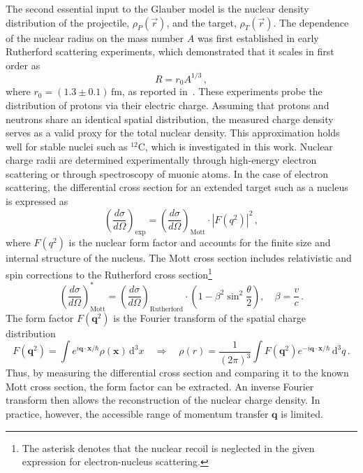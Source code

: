 \begin{description}
The second essential input to the Glauber model is the nuclear density distribution of the projectile, \( \rho_P(\vec{r}) \), and the target, \( \rho_T(\vec{r}) \). The dependence of the nuclear radius on the mass number \( A \) was first established in early Rutherford scattering experiments, which demonstrated that it scales in first order as
\begin{equation}
R = r_0 A^{1/3} \, ,
\end{equation}
where \( r_0 = (1.3 \pm 0.1)\,\text{fm} \), as reported in~\cite{pollard1935nuclear}. These experiments probe the distribution of protons via their electric charge. Assuming that protons and neutrons share an identical spatial distribution, the measured charge density serves as a valid proxy for the total nuclear density. This approximation holds well for stable nuclei such as \( ^{12}\text{C} \), which is investigated in this work.
Nuclear charge radii are determined experimentally through high-energy electron scattering or through spectroscopy of muonic atoms. In the case of electron scattering, the differential cross section for an extended target such as a nucleus is expressed as
\begin{equation}
\left( \frac{d\sigma}{d\Omega} \right)_{\text{exp}} = \left( \frac{d\sigma}{d\Omega} \right)_{\text{Mott}} \cdot \left| F(q^2) \right|^2 \, ,
\end{equation}
where \( F(q^2) \) is the nuclear form factor and accounts for the finite size and internal structure of the nucleus. The Mott cross section includes relativistic and spin corrections to the Rutherford cross section\footnote{The asterisk denotes that the nuclear recoil is neglected in the given expression for electron-nucleus scattering.}
\begin{equation}
\left( \frac{d\sigma}{d\Omega} \right)^{*}_{\text{Mott}} = \left( \frac{d\sigma}{d\Omega} \right)_{\text{Rutherford}} \cdot \left( 1 - \beta^2 \sin^2 \frac{\theta}{2} \right), \quad \beta = \frac{v}{c} \, .
\end{equation}
The form factor \( F(\mathbf{q}^2) \) is the Fourier transform of the spatial charge distribution
\begin{equation}
F(\mathbf{q}^2) = \int e^{i\mathbf{q}\cdot\mathbf{x}/\hbar} \rho(\mathbf{x}) \,\mathrm{d}^3x 
\quad \Rightarrow \quad 
\rho(r) = \frac{1}{(2\pi)^3} \int F(\mathbf{q}^2) e^{-i\mathbf{q}\cdot\mathbf{x}/\hbar} \,\mathrm{d}^3q \, .
\end{equation}
Thus, by measuring the differential cross section and comparing it to the known Mott cross section, the form factor can be extracted. An inverse Fourier transform then allows the reconstruction of the nuclear charge density. In practice, however, the accessible range of momentum transfer \( \mathbf{q} \) is limited.

\end{description}
